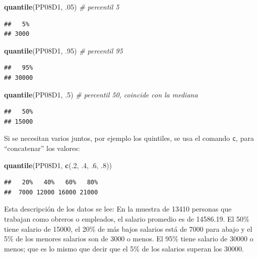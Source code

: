 \documentclass[]{book}
\newenvironment{Shaded}{\begin{snugshade}}{\end{snugshade}}
\newcommand{\CommentTok}[1]{\textcolor[rgb]{0.56,0.35,0.01}{\textit{#1}}}
\newcommand{\DecValTok}[1]{\textcolor[rgb]{0.00,0.00,0.81}{#1}}
\newcommand{\FloatTok}[1]{\textcolor[rgb]{0.00,0.00,0.81}{#1}}
\newcommand{\KeywordTok}[1]{\textcolor[rgb]{0.13,0.29,0.53}{\textbf{#1}}}
\newcommand{\NormalTok}[1]{#1}
\begin{document}
\begin{Shaded}
\begin{Highlighting}[]
\KeywordTok{quantile}\NormalTok{(PP08D1, }\FloatTok{.05}\NormalTok{) }\CommentTok{# percentil 5}
\end{Highlighting}
\end{Shaded}

\begin{verbatim}
##   5% 
## 3000
\end{verbatim}

\begin{Shaded}
\begin{Highlighting}[]
\KeywordTok{quantile}\NormalTok{(PP08D1, }\FloatTok{.95}\NormalTok{) }\CommentTok{# percentil 95}
\end{Highlighting}
\end{Shaded}

\begin{verbatim}
##   95% 
## 30000
\end{verbatim}

\begin{Shaded}
\begin{Highlighting}[]
\KeywordTok{quantile}\NormalTok{(PP08D1, }\FloatTok{.5}\NormalTok{) }\CommentTok{# percentil 50, coincide con la mediana}
\end{Highlighting}
\end{Shaded}

\begin{verbatim}
##   50% 
## 15000
\end{verbatim}

Si se necesitan varios juntos, por ejemplo los quintiles, se usa el comando \texttt{c}, para ``concatenar'' los valores:

\begin{Shaded}
\begin{Highlighting}[]
\KeywordTok{quantile}\NormalTok{(PP08D1, }\KeywordTok{c}\NormalTok{(.}\DecValTok{2}\NormalTok{, }\FloatTok{.4}\NormalTok{, }\FloatTok{.6}\NormalTok{, }\FloatTok{.8}\NormalTok{))}
\end{Highlighting}
\end{Shaded}

\begin{verbatim}
##   20%   40%   60%   80% 
##  7000 12000 16000 21000
\end{verbatim}

Esta descripción de los datos se lee:
En la muestra de 13410 personas que trabajan como obreros o empleados, el salario promedio es de 14586.19. El 50\% tiene salario de 15000, el 20\% de más bajos salarios está de 7000 para abajo y el 5\% de los menores salarios son de 3000 o menos. El 95\% tiene salario de 30000 o menos; que es lo mismo que decir que el 5\% de los salarios superan los 30000.
\end{document}
